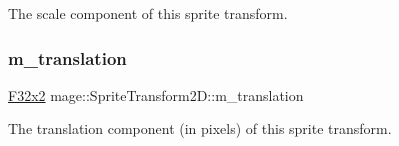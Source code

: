 The scale component of this sprite transform. \mbox{\label{classmage_1_1_sprite_transform2_d_a6c34b66fa388291771fcdfe3eefd023f}} 
\subsubsection{\texorpdfstring{m\+\_\+translation}{m\_translation}}
{\footnotesize\ttfamily \mbox{\hyperlink{namespacemage_aee4759dedc8def6c6dec26b5c7eddf29}{F32x2}} mage\+::\+Sprite\+Transform2\+D\+::m\+\_\+translation\hspace{0.3cm}{\ttfamily [private]}}

The translation component (in pixels) of this sprite transform. 